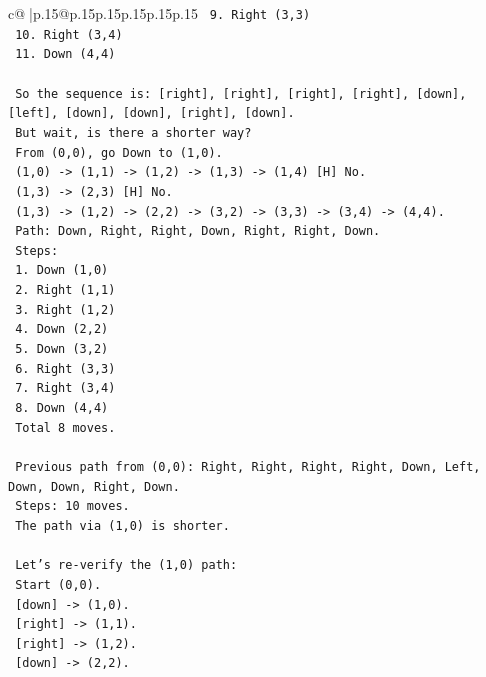 \documentclass{article}
\begin{document}
{\begin{supertabular}{c@{$\;$}|p{.15\linewidth}@{}p{.15\linewidth}p{.15\linewidth}p{.15\linewidth}p{.15\linewidth}p{.15\linewidth}}
{{{\texttt{   9. Right (3,3)} \\
\texttt{   10. Right (3,4)} \\
\texttt{   11. Down (4,4)} \\
\\ 
\texttt{   So the sequence is: {[}right{]}, {[}right{]}, {[}right{]}, {[}right{]}, {[}down{]}, {[}left{]}, {[}down{]}, {[}down{]}, {[}right{]}, {[}down{]}.} \\
\texttt{   But wait, is there a shorter way?} \\
\texttt{   From (0,0), go Down to (1,0).} \\
\texttt{   (1,0) {-}> (1,1) {-}> (1,2) {-}> (1,3) {-}> (1,4) {[}H{]} No.} \\
\texttt{   (1,3) {-}> (2,3) {[}H{]} No.} \\
\texttt{   (1,3) {-}> (1,2) {-}> (2,2) {-}> (3,2) {-}> (3,3) {-}> (3,4) {-}> (4,4).} \\
\texttt{   Path: Down, Right, Right, Down, Right, Right, Down.} \\
\texttt{   Steps:} \\
\texttt{   1. Down (1,0)} \\
\texttt{   2. Right (1,1)} \\
\texttt{   3. Right (1,2)} \\
\texttt{   4. Down (2,2)} \\
\texttt{   5. Down (3,2)} \\
\texttt{   6. Right (3,3)} \\
\texttt{   7. Right (3,4)} \\
\texttt{   8. Down (4,4)} \\
\texttt{   Total 8 moves.} \\
\\ 
\texttt{   Previous path from (0,0): Right, Right, Right, Right, Down, Left, Down, Down, Right, Down.} \\
\texttt{   Steps: 10 moves.} \\
\texttt{   The path via (1,0) is shorter.} \\
\\ 
\texttt{   Let's re{-}verify the (1,0) path:} \\
\texttt{   Start (0,0).} \\
\texttt{   {[}down{]} {-}> (1,0).} \\
\texttt{   {[}right{]} {-}> (1,1).} \\
\texttt{   {[}right{]} {-}> (1,2).} \\
\texttt{   {[}down{]} {-}> (2,2).} \\
}}}
\end{supertabular}}
\end{document}
